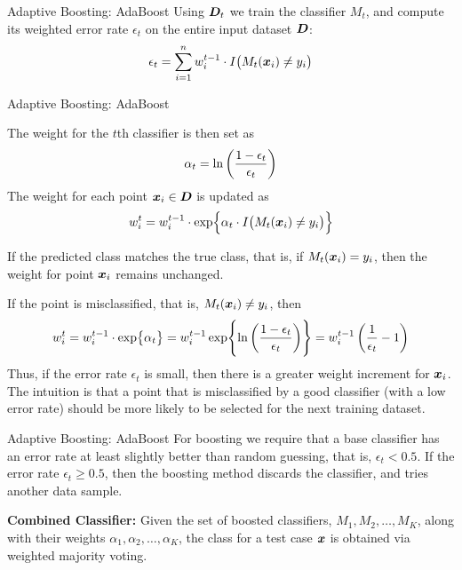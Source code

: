 {\begin{frame}{Adaptive Boosting: AdaBoost}
\medskip
Using ${\boldsymbol D}_t$ we train the
classif\/{i}er $M_{t}$, and compute its weighted error
rate $\epsilon_{t}$ on the entire input dataset ${\boldsymbol D}$:
\begin{align*}
  \epsilon_t = \sum_{i=1}^n w^{t-1}_i \cdot I\bigl(M_t({\boldsymbol x}_i) \ne y_i\bigr)
\end{align*}

\end{frame}



\begin{frame}{Adaptive Boosting: AdaBoost}

The weight for the $t$th classif\/{i}er is then set as
\begin{align*}
  \alpha_{t} =  \ln\left( \frac{1-\epsilon_{t}}{\epsilon_{t}}\right)
\end{align*}
The weight for each point ${\boldsymbol x}_i \in {\boldsymbol D}$ is updated as
\begin{align*}
  w^{t}_i = w^{t-1}_i \cdot \exp \Bigl\{ \alpha_{t} \cdot
  I\bigl(M_t({\boldsymbol x}_i) \ne y_i\bigr) \Bigr\}
\end{align*}

\medskip
If the predicted class matches the true class, that is, if
$M_{t}({\boldsymbol x}_i) = y_i$, then  the
weight for point ${\boldsymbol x}_i$ remains unchanged. 

\medskip
If
the point is misclassif\/{i}ed, that is, $M_t({\boldsymbol x}_i) \ne y_i$, then \begin{align*}
  w^{t}_i = w^{t-1}_i \cdot \exp \bigl\{ \alpha_{t} \bigr\}  =
  w^{t-1}_i \exp \Biggl\{
    \ln \left( \frac{1-\epsilon_{t}}{\epsilon_{t}}\right)
  \Biggr\}
  = w^{t-1}_i \left({1 \over \epsilon_{t}} -1\right)
\end{align*}
Thus, if the error rate $\epsilon_{t}$ is small,
then there is a greater weight increment for ${\boldsymbol x}_i$. 
The
intuition is that a point that is misclassif\/{i}ed by a good
classif\/{i}er (with a low error rate) should be more likely to be
selected for the next training dataset. 
\end{frame}



\begin{frame}{Adaptive Boosting: AdaBoost}
For boosting
we require that a base classif\/{i}er has an error
rate at least slightly better than random guessing, that is,
$\epsilon_{t} < 0.5$.  
If the error rate $\epsilon_t \ge 0.5$,
then the boosting method discards the classif\/{i}er, and tries 
another data sample.

\medskip
{\bf Combined Classifier:}
Given the set of boosted classif\/{i}ers, $M_1, M_2, \ldots, M_K$,
along with their weights $\alpha_1, \alpha_2, \ldots, \alpha_K$,
the class for a test case ${\boldsymbol x}$ is
obtained via weighted majority voting.


\end{frame}}
